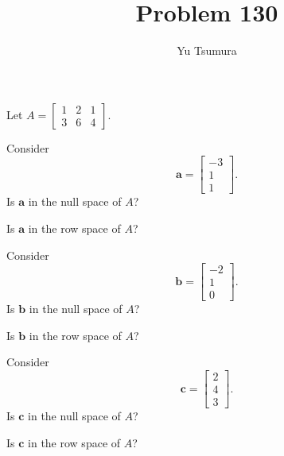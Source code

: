\documentclass{ximera}
\title{Problem 130}
\author{Yu Tsumura}
\begin{document}
Let $A=\begin{bmatrix}
  1 & 2 & 1 \\
  3 &6 &4 
\end{bmatrix}$.


\begin{problem}
  Consider \[\mathbf{a}=\begin{bmatrix}
      -3 \\
      1 \\
      1 
    \end{bmatrix}.\]
  Is $\mathbf{a}$ in the null space of $A$?
  \begin{multipleChoice}
  \end{multipleChoice}

  Is $\mathbf{a}$ in the row space of $A$?
  \begin{multipleChoice}
  \end{multipleChoice}
\end{problem}

\begin{problem}
  Consider \[\mathbf{b}=\begin{bmatrix}
	  -2 \\
	   1 \\
	    0 
    \end{bmatrix}.\]
  Is $\mathbf{b}$ in the null space of $A$?
  \begin{multipleChoice}
  \end{multipleChoice}

  Is $\mathbf{b}$ in the row space of $A$?
  \begin{multipleChoice}
  \end{multipleChoice}
\end{problem}


\begin{problem}
  Consider \[\mathbf{c}=\begin{bmatrix}
	  2 \\
	   4 \\
	    3 
    \end{bmatrix}.\]
  Is $\mathbf{c}$ in the null space of $A$?
  \begin{multipleChoice}
  \end{multipleChoice}

  Is $\mathbf{c}$ in the row space of $A$?
  \begin{multipleChoice}
  \end{multipleChoice}
\end{problem}
\end{document}
